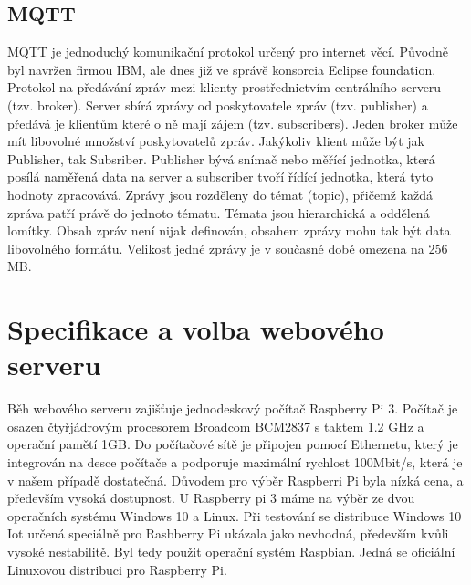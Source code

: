 \documentclass[a4paper,12pt,czech,bibliography=totoc]{scrbook}
\begin{document}
\section{MQTT}
MQTT je jednoduchý komunikační protokol určený pro internet věcí. Původně byl navržen firmou IBM, ale dnes již ve správě konsorcia Eclipse foundation. Protokol na předávání zpráv mezi klienty prostřednictvím centrálního serveru (tzv. broker). Server sbírá zprávy od poskytovatele zpráv (tzv. publisher) a předává je klientům které o ně mají zájem (tzv. subscribers). Jeden broker může mít libovolné množství poskytovatelů zpráv. Jakýkoliv klient může být jak Publisher, tak Subsriber. Publisher bývá snímač nebo měřící jednotka, která posílá naměřená data na server a subscriber tvoří řídící jednotka, která tyto hodnoty zpracovává.
\newline
\newline
Zprávy jsou rozděleny do témat (topic), přičemž každá zpráva patří právě do jednoto tématu. Témata jsou hierarchická a oddělená lomítky. Obsah zpráv není nijak definován, obsahem zprávy mohu tak být data libovolného formátu.  Velikost jedné zprávy je v současné době omezena na 256 MB.
\chapter{Specifikace a volba webového serveru}
Běh webového serveru zajišťuje jednodeskový počítač Raspberry Pi 3. Počítač je osazen čtyřjádrovým procesorem Broadcom BCM2837 s taktem 1.2 GHz a operační pamětí 1GB. Do počítačové sítě je připojen pomocí Ethernetu, který je integrován na desce počítače a podporuje maximální rychlost 100Mbit/s, která je v našem případě dostatečná. Důvodem pro výběr Raspberri Pi byla nízká cena, a především vysoká dostupnost.  \newline
U Raspberry pi 3 máme na výběr ze dvou operačních systému Windows 10 a Linux. Při testování se distribuce Windows 10 Iot určená speciálně pro Rasbberry Pi ukázala jako nevhodná, především kvůli vysoké nestabilitě. Byl tedy použit operační systém Raspbian. Jedná se oficiální Linuxovou distribuci pro Raspberry Pi.  
\end{document}
